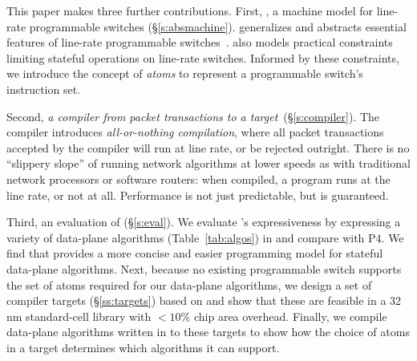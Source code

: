 This paper makes three further contributions. First, {\em
  \absmachine}, a machine model for line-rate programmable switches
(\S\ref{s:absmachine}). \absmachine generalizes and abstracts
essential features of line-rate programmable switches~\cite{rmt,
  xpliant, flexpipe}. \absmachine also models practical constraints
limiting stateful operations on line-rate switches.  Informed by these
constraints, we introduce the concept of {\em atoms} to represent a
programmable switch's instruction set.

Second, {\em a compiler from \pktlanguage packet transactions to a
  \absmachine target}~(\S\ref{s:compiler}). The \pktlanguage compiler
introduces \textit{all-or-nothing compilation}, where all packet
transactions accepted by the compiler will run at line rate, or be
rejected outright. There is no ``slippery slope'' of running network
algorithms at lower speeds as with traditional network processors or
software routers: when compiled, a \pktlanguage program runs at the
line rate, or not at all. Performance is not just predictable, but
is guaranteed.

Third, an evaluation of \pktlanguage (\S\ref{s:eval}). We evaluate
\pktlanguage's expressiveness by expressing a variety of data-plane
algorithms (Table~\ref{tab:algos}) in \pktlanguage and compare with
P4. We find that \pktlanguage provides a more concise and easier
programming model for stateful data-plane algorithms.  Next, because
no existing programmable switch supports the set of atoms required for
our data-plane algorithms, we design a set of compiler targets
(\S\ref{ss:targets}) based on \absmachine and show that these are
feasible in a 32 nm standard-cell library with $< 10\%$ chip area
overhead.  Finally, we compile data-plane algorithms written in
\pktlanguage to these targets to show how the choice of atoms in a
target determines which algorithms it can support.
